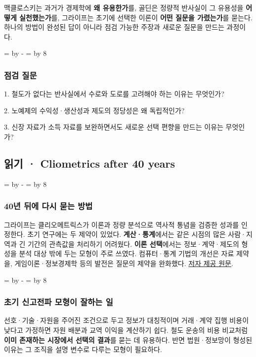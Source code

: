 \documentclass[10pt,a4paper]{article}
\newcommand{\ReserveReadingSectionSpace}{%
  \par\begingroup
  \dimen0=\pagegoal \advance\dimen0 by -\pagetotal
  \dimen2=\baselineskip \multiply\dimen2 by 8
  \ifdim\dimen0<\dimen2 \newpage\fi
  \endgroup}
\begin{document}
맥클로스키는 과거가 경제학에 \textbf{왜 유용한가}를, 골딘은 정량적 반사실이 그 유용성을 \textbf{어떻게 실천했는가}를, 그라이프는 초기에 선택한 이론이 \textbf{어떤 질문을 가렸는가}를 묻는다. 하나의 방법이 완성된 답이 아니라 점검 가능한 주장과 새로운 질문을 만드는 과정이다.\par

\ReserveReadingSectionSpace
\subsubsection*{점검 질문}

1. 철도가 없다는 반사실에서 수로와 도로를 고려해야 하는 이유는 무엇인가?\par
2. 노예제의 수익성·생산성과 제도의 정당성은 왜 독립적인가?\par
3. 신장 자료가 소득 자료를 보완하면서도 새로운 선택 편향을 만드는 이유는 무엇인가?\par


\clearpage{}
{}
\subsection*{읽기 · Cliometrics after 40 years}
\ReserveReadingSectionSpace
\subsubsection*{40년 뒤에 다시 묻는 방법}

그라이프는 클리오메트릭스가 이론과 정량 분석으로 역사적 통념을 검증한 성과를 인정한다. 초기 연구에는 두 제약이 있었다. \textbf{계산·통계}에서는 같은 시점의 많은 사람·지역과 긴 기간의 관측값을 처리하기 어려웠다. \textbf{이론 선택}에서는 정보·계약·제도의 형성을 분석 대상 밖에 두는 모형이 주로 쓰였다. 컴퓨터·통계 기법의 개선은 자료 제약을, 게임이론·정보경제학 등의 발전은 질문의 제약을 완화했다. \href{https://web.stanford.edu/\%7Eavner/Greif\_Papers/1997\%20Clio\%20AER.pdf}{저자 제공 원문}.\par

\ReserveReadingSectionSpace
\subsubsection*{초기 신고전파 모형이 잘하는 일}

선호·기술·자원을 주어진 조건으로 두고 정보가 대칭적이며 거래·계약 집행 비용이 낮다고 가정하면 자원 배분과 교역 이익을 계산하기 쉽다. 철도 운송의 비용 비교처럼 \textbf{이미 존재하는 시장에서 선택의 결과}를 묻는 데 유용하다. 반면 법원·정보망이 형성된 이유는 그 조직을 설명 변수로 다루는 모형이 필요하다.\par
\end{document}
